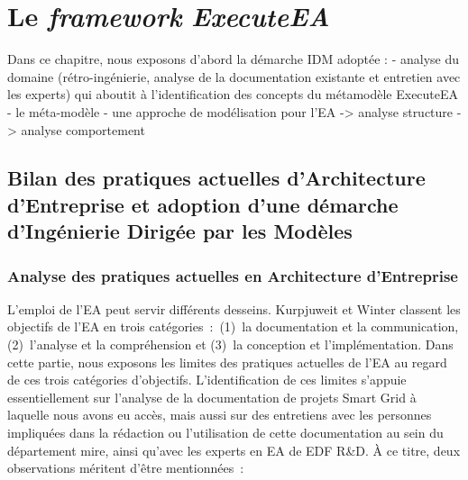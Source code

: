 \chapter{Le \emph{framework} \emph{ExecuteEA} }
\label{ch:proposition}

\PartialToc


Dans ce chapitre, nous exposons d'abord la démarche IDM adoptée :
- analyse du domaine (rétro-ingénierie, analyse de la documentation existante et entretien avec les experts) qui aboutit à l'identification des concepts du métamodèle ExecuteEA
- le méta-modèle
- une approche de modélisation pour l'EA
-> analyse structure
-> analyse comportement

\section[Bilan des pratiques actuelles d'EA et adoption d'une démarche IDM]{Bilan des pratiques actuelles d'Architecture d'Entreprise et adoption d'une démarche d'Ingénierie Dirigée par les Modèles}

\subsection{Analyse des pratiques actuelles en Architecture d'Entreprise}


L'emploi de l'EA peut servir différents desseins. Kurpjuweit et Winter
\cite{kurpjuweit2007viewpoint} classent les objectifs de l'EA en trois
catégories~:~(1)~la documentation et la communication, (2)~l'analyse et la
compréhension et (3)~la conception et l'implémentation. Dans cette partie, nous
exposons les limites des pratiques actuelles de l'EA au regard de ces trois
catégories d'objectifs. L'identification de ces limites s'appuie
essentiellement sur l'analyse de la documentation de projets Smart Grid à
laquelle nous avons eu accès, mais aussi sur des entretiens avec les personnes
impliquées dans la rédaction ou l'utilisation de cette documentation au sein du
département \gls{mire}, ainsi qu'avec les experts en EA de EDF R\&D. À ce
titre, deux observations méritent d'être mentionnées~:

